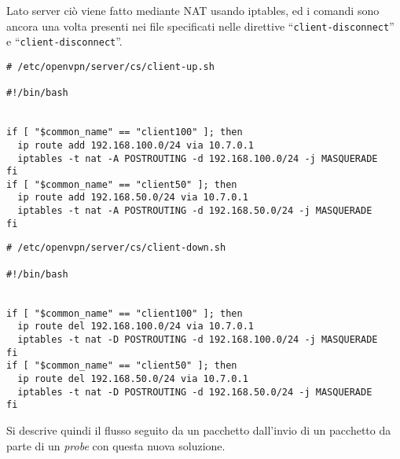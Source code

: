 Lato server ciò viene fatto mediante
NAT usando iptables, ed i comandi sono ancora una volta presenti
nei file specificati nelle direttive ``\texttt{client-disconnect}'' e ``\texttt{client-disconnect}''.
\begin{verbatim}
# /etc/openvpn/server/cs/client-up.sh

#!/bin/bash


if [ "$common_name" == "client100" ]; then
  ip route add 192.168.100.0/24 via 10.7.0.1
  iptables -t nat -A POSTROUTING -d 192.168.100.0/24 -j MASQUERADE
fi
if [ "$common_name" == "client50" ]; then
  ip route add 192.168.50.0/24 via 10.7.0.1
  iptables -t nat -A POSTROUTING -d 192.168.50.0/24 -j MASQUERADE
fi
\end{verbatim}
\begin{verbatim}
# /etc/openvpn/server/cs/client-down.sh

#!/bin/bash


if [ "$common_name" == "client100" ]; then
  ip route del 192.168.100.0/24 via 10.7.0.1
  iptables -t nat -D POSTROUTING -d 192.168.100.0/24 -j MASQUERADE
fi
if [ "$common_name" == "client50" ]; then
  ip route del 192.168.50.0/24 via 10.7.0.1
  iptables -t nat -D POSTROUTING -d 192.168.50.0/24 -j MASQUERADE
fi
\end{verbatim}
Si descrive quindi il flusso
seguito da un pacchetto dall'invio di un pacchetto da parte di un \textit{probe} con questa nuova
soluzione.
